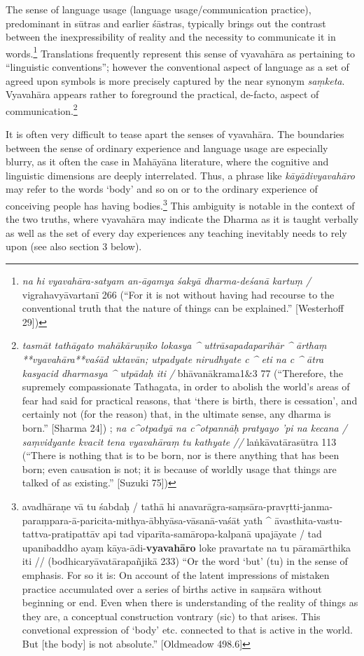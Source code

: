 \documentclass[
  letterpaper,
  DIV=11,
  numbers=noendperiod,
  oneside]{scrreprt}
\begin{document}
The sense of language usage (language usage/communication practice),
predominant in sūtras and earlier śāstras, typically brings out the
contrast between the inexpressibility of reality and the necessity to
communicate it in words.\footnote{\emph{na hi vyavahāra-satyam an-āgamya
  śakyā dharma-deśanā kartuṃ /} vigrahavyāvartanī 266 (``For it is not
  without having had recourse to the conventional truth that the nature
  of things can be explained.'' {[}Westerhoff 29{]})} Translations
frequently represent this sense of vyavahāra as pertaining to
``linguistic conventions''; however the conventional aspect of language
as a set of agreed upon symbols is more precisely captured by the near
synonym \emph{saṃketa}. Vyavahāra appears rather to foreground the
practical, de-facto, aspect of communication.\footnote{\emph{tasmāt
  tathāgato mahākāruṇiko lokasya \^{} uttrāsapadaparihār \^{} ārthaṃ
  **vyavahāra**vaśād uktavān; utpadyate nirudhyate c \^{} eti na c \^{}
  ātra kasyacid dharmasya \^{} utpādaḥ iti /} bhāvanākrama1\&3 77
  (``Therefore, the supremely compassionate Tathagata, in order to
  abolish the world's areas of fear had said for practical reasons, that
  `there is birth, there is cessation', and certainly not (for the
  reason) that, in the ultimate sense, any dharma is born.'' {[}Sharma
  24{]}) ; \emph{na c\^{}otpadyā na c\^{}otpannāḥ pratyayo 'pi na kecana
  / saṃvidyante kvacit tena vyavahāraṃ tu kathyate //} laṅkāvatārasūtra
  113 (``There is nothing that is to be born, nor is there anything that
  has been born; even causation is not; it is because of worldly usage
  that things are talked of as existing.'' {[}Suzuki 75{]})}

It is often very difficult to tease apart the senses of vyavahāra. The
boundaries between the sense of ordinary experience and language usage
are especially blurry, as it often the case in Mahāyāna literature,
where the cognitive and linguistic dimensions are deeply interrelated.
Thus, a phrase like \emph{kāyādivyavahāro} may refer to the words `body'
and so on or to the ordinary experience of conceiving people has having
bodies.\footnote{avadhāraṇe vā tu śabdaḥ / tathā hi
  anavarāgra-saṃsāra-pravṛtti-janma-paraṃpara-ā-paricita-mithya-ābhyāsa-vāsanā-vaśāt
  yath \^{} āvasthita-vastu-tattva-pratipattāv api tad
  viparīta-samāropa-kalpanā upajāyate / tad upanibaddho ayaṃ
  kāya-ādi-\textbf{vyavahāro} loke pravartate na tu pāramārthika iti //
  (bodhicaryāvatārapañjikā 233) ``Or the word `but' (tu) in the sense of
  emphasis. For so it is: On account of the latent impressions of
  mistaken practice accumulated over a series of births active in
  saṃsāra without beginning or end. Even when there is understanding of
  the reality of things as they are, a conceptual construction vontrary
  (sic) to that arises. This convetional expression of `body' etc.
  connected to that is active in the world. But {[}the body{]} is not
  absolute.'' {[}Oldmeadow 498.6{]}} This ambiguity is notable in the
context of the two truths, where vyavahāra may indicate the Dharma as it
is taught verbally as well as the set of every day experiences any
teaching inevitably needs to rely upon (see also section 3 below).
\end{document}

